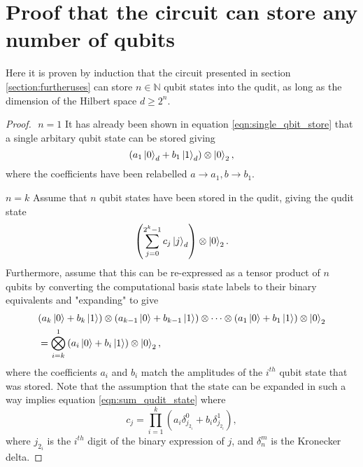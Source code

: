 \appendix
\appendixpage
\addappheadtotoc
\setcounter{equation}{0}
\renewcommand{\theequation}{A.\arabic{equation}}
\section{Proof that the circuit can store any number of qubits}
\label{appendix:any_num_qubits}
Here it is proven by induction that the circuit presented in section \ref{section:furtheruses} can store $n\in\mathbb{N}$ qubit states into the qudit, as long as the dimension of the Hilbert space $d\geq 2^n$.
\begin{proof}$ $\newline
    $n=1$\newline
    It has already been shown in equation \ref{eqn:single_qbit_store} that a single arbitary qubit state can be stored giving
    \begin{equation}
        (a_1\ket{0}_d + b_1\ket{1}_d)\otimes\ket{0}_2,
    \end{equation}
    where the coefficients have been relabelled $a \rightarrow a_1, b\rightarrow b_1$.
    \newline

    $n = k$\newline
    Assume that $n$ qubit states have been stored in the qudit, giving the qudit state
    \begin{equation}
        \left(\sum_{j=0}^{2^k - 1}c_j\ket{j}_d\right)\otimes\ket{0}_2.
        \label{eqn:sum_qudit_state}
    \end{equation}
    Furthermore, assume that this can be re-expressed as a tensor product of $n$ qubits by converting the computational basis state labels to their binary equivalents and "expanding" to give
    \begin{align}
        &(a_k\ket{0} + b_k\ket{1})\otimes(a_{k-1}\ket{0} + b_{k-1}\ket{1})\otimes\cdots\otimes(a_1\ket{0} + b_1\ket{1})\otimes\ket{0}_2\\
        &=\bigotimes_{i = k}^{1}\left(a_i\ket{0} + b_i\ket{1}\right)\otimes\ket{0}_2,
    \end{align}
    where the coefficients $a_{i}$ and $b_{i}$ match the amplitudes of the $i^{th}$ qubit state that was stored.
    Note that the assumption that the state can be expanded in such a way implies equation \ref{eqn:sum_qudit_state} where
    \begin{equation}
        c_j = \prod_{i=1}^{k}(a_i \delta^{0}_{j_{2_i}} + b_i\delta^{1}_{j_{2_i}}),
    \end{equation}
    where $j_{2_i}$ is the $i^{th}$ digit of the binary expression of $j$, and $\delta^m_n$ is the Kronecker delta.\newline


\end{proof}
